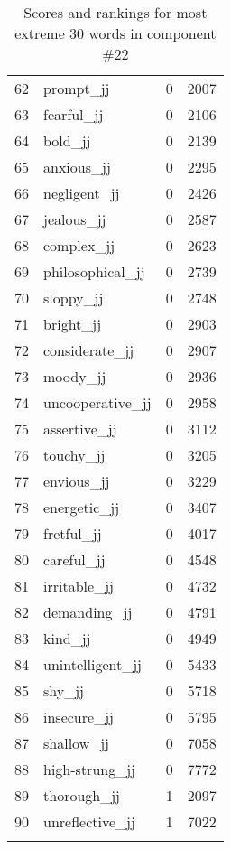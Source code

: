 \begin{longtable}[!htbp]{| rlr@{.}l |}
    62 & prompt\_jj & 0 & 2007 \\
    63 & fearful\_jj & 0 & 2106 \\
    64 & bold\_jj & 0 & 2139 \\
    65 & anxious\_jj & 0 & 2295 \\
    66 & negligent\_jj & 0 & 2426 \\
    67 & jealous\_jj & 0 & 2587 \\
    68 & complex\_jj & 0 & 2623 \\
    69 & philosophical\_jj & 0 & 2739 \\
    70 & sloppy\_jj & 0 & 2748 \\
    71 & bright\_jj & 0 & 2903 \\
    72 & considerate\_jj & 0 & 2907 \\
    73 & moody\_jj & 0 & 2936 \\
    74 & uncooperative\_jj & 0 & 2958 \\
    75 & assertive\_jj & 0 & 3112 \\
    76 & touchy\_jj & 0 & 3205 \\
    77 & envious\_jj & 0 & 3229 \\
    78 & energetic\_jj & 0 & 3407 \\
    79 & fretful\_jj & 0 & 4017 \\
    80 & careful\_jj & 0 & 4548 \\
    81 & irritable\_jj & 0 & 4732 \\
    82 & demanding\_jj & 0 & 4791 \\
    83 & kind\_jj & 0 & 4949 \\
    84 & unintelligent\_jj & 0 & 5433 \\
    85 & shy\_jj & 0 & 5718 \\
    86 & insecure\_jj & 0 & 5795 \\
    87 & shallow\_jj & 0 & 7058 \\
    88 & high-strung\_jj & 0 & 7772 \\
    89 & thorough\_jj & 1 & 2097 \\
    90 & unreflective\_jj & 1 & 7022 \\
    \hline
    \caption{Scores and rankings for most extreme 30 words in component \#22} \\
\end{longtable}
